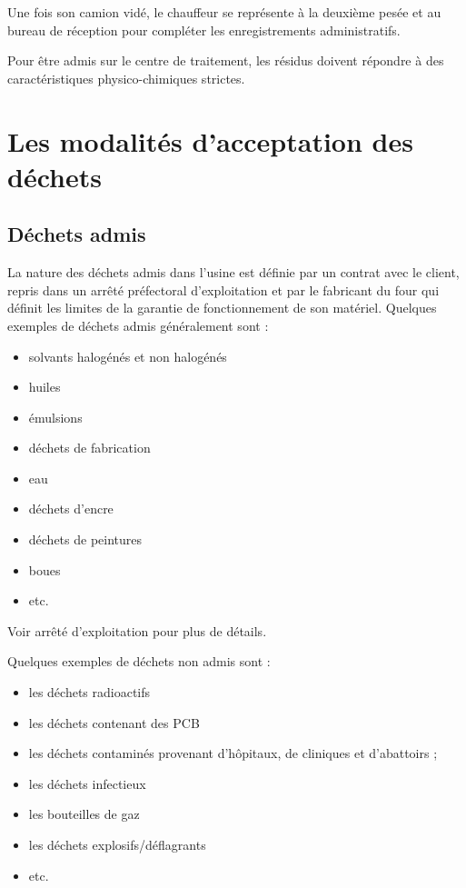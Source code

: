 Une fois son camion vidé, le chauffeur se représente à la deuxième pesée et au bureau de réception pour compléter les enregistrements administratifs.
\vspace{0.3cm}

Pour être admis sur le centre de traitement, les résidus doivent répondre à des caractéristiques physico-chimiques strictes.


\section{Les modalités d’acceptation des déchets}


\subsection{Déchets admis}
La nature des déchets admis dans l’usine est définie par un contrat avec le client, repris dans un arrêté préfectoral d’exploitation et par le fabricant du four qui définit les limites de la garantie de fonctionnement de son matériel.
Quelques exemples de déchets admis généralement sont :

\begin{itemize}
 
\item solvants halogénés et non halogénés
\item huiles
\item émulsions
\item déchets de fabrication
\item eau
\item déchets d'encre
\item déchets de peintures
\item boues
\item etc.
 
\end{itemize}

Voir arrêté d’exploitation pour plus de détails.
\vspace{0.3cm}

Quelques exemples de déchets non admis sont :

\begin{itemize}

\item les déchets radioactifs
\item les déchets contenant des PCB
\item les déchets contaminés provenant d'hôpitaux, de cliniques et d'abattoirs ;
\item les déchets infectieux
\item les bouteilles de gaz
\item les déchets explosifs/déflagrants
\item etc.
\end{itemize}

